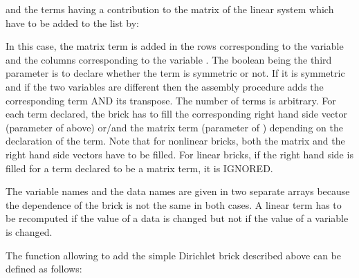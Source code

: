 \documentclass[a4paper,11pt,english]{sphinxmanual}
\begin{document}
\begin{sphinxVerbatim}[commandchars=\\\{\}]
\end{sphinxVerbatim}

and the terms having a contribution to the matrix of the linear system which have
to be added to the list by:

\begin{sphinxVerbatim}[commandchars=\\\{\}]
  
\end{sphinxVerbatim}

In this case, the matrix term is added in the rows corresponding to the variable
 and the columns corresponding to the variable . The
boolean being the third parameter is to declare whether the term is symmetric or not.
If it is symmetric and if the two variables are different then the assembly
procedure adds the corresponding term AND its transpose. The number of terms is
arbitrary. For each term declared, the brick has to fill the corresponding right
hand side vector (parameter  of  above) or/and
the matrix term (parameter  of ) depending on
the declaration of the term. Note that for nonlinear bricks, both the matrix and
the right hand side vectors have to be filled. For linear bricks, if the right
hand side is filled for a term declared to be a matrix term, it is IGNORED.

The variable names and the data names are given in two separate arrays because the
dependence of the brick is not the same in both cases. A linear term has to be
recomputed if the value of a data is changed but not if the value of a variable is
changed.

The function allowing to add the simple Dirichlet brick described above can be
defined as follows:
\end{document}
